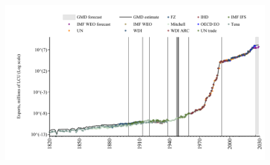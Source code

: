 \documentclass[12pt,a4paper,landscape]{article}
\begin{document}
\begin{adjustbox}{max totalsize={\paperwidth}{\paperheight},center}
\begin{minipage}[t][\textheight][t]{\textwidth}
\begin{figure}[H]
\includegraphics[width=\textwidth,height=0.6\textheight,keepaspectratio]{graphs/ARG_exports.pdf}
\end{figure}
\end{minipage}
\end{adjustbox}
\end{document}
